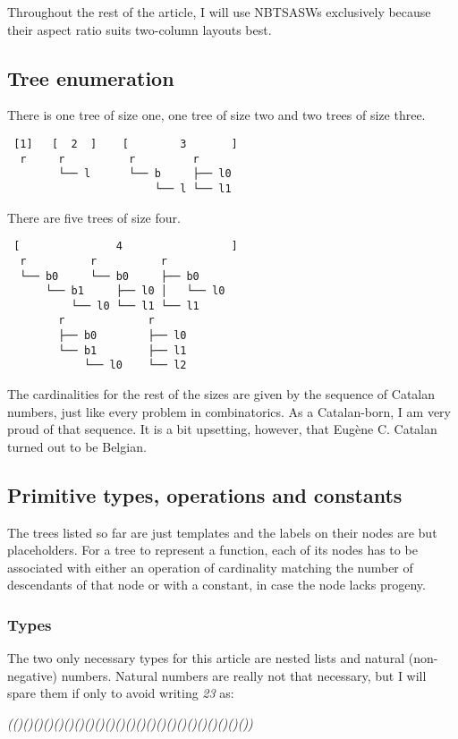 \documentclass[12pt,twocolumn]{article}
\begin{document}
Throughout the rest of the article, I will use NBTSASWs exclusively because their aspect ratio suits two-column layouts best.

\subsection{Tree enumeration}
There is one tree of size one, one tree of size two and two trees of size three.

\begin{verbatim}
 [1]   [  2  ]    [        3       ]
  r     r          r         r
        └── l      └── b     ├── l0
                       └── l └── l1
\end{verbatim}

There are five trees of size four.
\begin{verbatim}
 [               4                 ]
  r          r          r         
  └── b0     └── b0     ├── b0    
      └── b1     ├── l0 │   └── l0
          └── l0 └── l1 └── l1    
        r             r
        ├── b0        ├── l0
        └── b1        ├── l1
            └── l0    └── l2
\end{verbatim}

The cardinalities for the rest of the sizes are given by the sequence of Catalan numbers, just like every problem in combinatorics\cite{RPStanley2001}. As a Catalan-born, I am very proud of that sequence. It is a bit upsetting, however, that Eugène C. Catalan turned out to be Belgian.

\subsection{Primitive types, operations and constants}\label{subsec_primitives}
The trees listed so far are just templates and the labels on their nodes are but placeholders. For a tree to represent a function, each of its nodes has to be associated with either an operation of cardinality matching the number of descendants of that node or with a constant, in case the node lacks progeny. 

\subsubsection{Types}
The two only necessary types for this article are nested lists and natural (non-negative) numbers. Natural numbers are really not that necessary, but I will spare them if only to avoid writing \emph{23} as:

\emph{(()()()()()()()()()()()()()()()()()()()()()()())}
\end{document}
